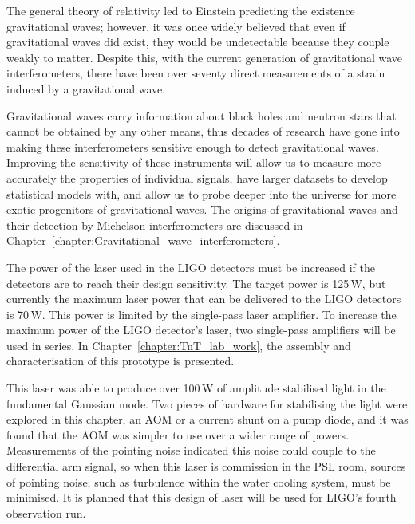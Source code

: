 The general theory of relativity led to Einstein predicting the existence gravitational waves; however, it was once widely believed that even if gravitational waves did exist, they would be undetectable because they couple weakly to matter. Despite this, with the current generation of gravitational wave interferometers, there have been over seventy direct measurements of a strain induced by a gravitational wave.
\par
Gravitational waves carry information about black holes and neutron stars that cannot be obtained by any other means, thus decades of research have gone into making these interferometers sensitive enough to detect gravitational waves. Improving the sensitivity of these instruments will allow us to measure more accurately the properties of individual signals, have larger datasets to develop statistical models with, and allow us to probe deeper into the universe for more exotic progenitors of gravitational waves. The origins of gravitational waves and their detection by Michelson interferometers are discussed in Chapter~\ref{chapter:Gravitational_wave_interferometers}.
\par
The power of the laser used in the LIGO detectors must be increased if the detectors are to reach their design sensitivity. The target power is 125\,W, but currently the maximum laser power that can be delivered to the LIGO detectors is 70\,W. This power is limited by the single-pass laser amplifier. To increase the maximum power of the LIGO detector's laser, two single-pass amplifiers will be used in series. In Chapter~\ref{chapter:TnT_lab_work}, the assembly and characterisation of this prototype is presented. 
\par
This laser was able to produce over 100\,W of amplitude stabilised light in the fundamental Gaussian mode. Two pieces of hardware for stabilising the light were explored in this chapter, an AOM or a current shunt on a pump diode, and it was found that the AOM was simpler to use over a wider range of powers. Measurements of the pointing noise indicated this noise could couple to the differential arm signal, so when this laser is commission in the PSL room, sources of pointing noise, such as turbulence within the water cooling system, must be minimised. It is planned that this design of laser will be used for LIGO's fourth observation run.
